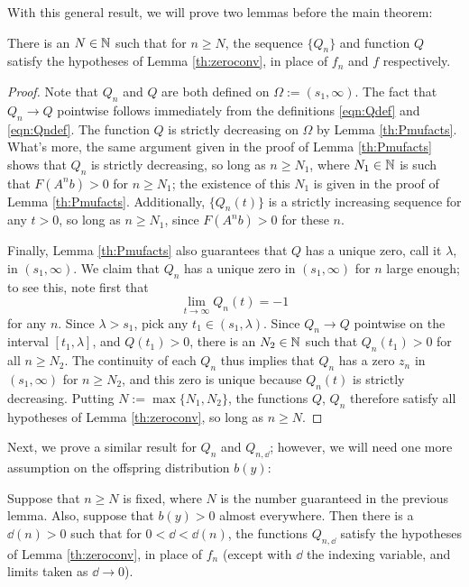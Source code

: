 With this general result, we will prove two lemmas before the main theorem:

\begin{lemma} \label{th:QandQn}
	There is an $N \in \mathbb{N}$ such that for $n \geq N$, the sequence $\{Q_n\}$ and function $Q$ satisfy the hypotheses of Lemma \ref{th:zeroconv}, in place of $f_n$ and $f$ respectively.
\end{lemma}

\begin{proof}
	Note that $Q_n$ and $Q$ are both defined on $\Omega:= (s_1, \infty)$. The fact that $Q_n \to Q$ pointwise follows immediately from the definitions \eqref{eqn:Qdef} and \eqref{eqn:Qndef}. The function $Q$ is strictly decreasing on $\Omega$ by Lemma \ref{th:Pmufacts}. What's more, the same argument given in the proof of Lemma \ref{th:Pmufacts} shows that $Q_n$ is strictly decreasing, so long as $n \geq N_1$, where $N_1 \in \mathbb{N}$ is such that $F(A^n b) > 0$ for $n \geq N_1$; the existence of this $N_1$ is given in the proof of Lemma \ref{th:Pmufacts}. Additionally, $\{Q_n(t)\}$ is a strictly increasing sequence for any $t > 0$, so long as $n \geq N_1$, since $F(A^n b )>0$ for these $n$.
	
	Finally, Lemma \ref{th:Pmufacts} also guarantees that $Q$ has a unique zero, call it $\lambda$, in $(s_1, \infty)$. We claim that $Q_n$ has a unique zero in $(s_1, \infty)$ for $n$ large enough; to see this, note first that 
	\[\lim_{t \to \infty} Q_n(t) = -1\]
	 for any $n$. Since $\lambda > s_1$, pick any $t_1 \in (s_1, \lambda)$. Since $Q_n \to Q$ pointwise on the interval $[t_1, \lambda]$, and $Q(t_1) > 0$, there is an $N_2 \in \mathbb{N}$ such that $Q_n(t_1) > 0$ for all $n \geq N_2$. The continuity of each $Q_n$ thus implies that $Q_n$ has a zero $z_n$ in $(s_1, \infty)$ for $n \geq N_2$, and this zero is unique because $Q_n(t)$ is strictly decreasing. Putting $N:= \max\{N_1, N_2\}$, the functions $Q$, $Q_n$ therefore satisfy all hypotheses of Lemma \ref{th:zeroconv}, so long as $n \geq N$.
\end{proof}

Next, we prove a similar result for $Q_n$ and $Q_{n, \dd}$; however, we will need one more assumption on the offspring distribution $b(y)$:

\begin{lemma} \label{th:QnandQnd}
	Suppose that $n \geq N$ is fixed, where $N$ is the number guaranteed in the previous lemma. Also, suppose that $b(y) > 0$ almost everywhere. Then there is a $\dd(n)>0$ such that for $0< \dd < \dd(n)$, the functions $Q_{n, \dd}$ satisfy the hypotheses of Lemma \ref{th:zeroconv}, in place of $f_n$ (except with $\dd$ the indexing variable, and limits taken as $\dd \to 0$).
\end{lemma}

